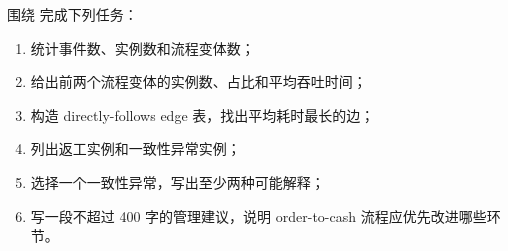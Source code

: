 \begin{exercise}
围绕  完成下列任务：
\begin{enumerate}[nosep]
  \item 统计事件数、实例数和流程变体数；
  \item 给出前两个流程变体的实例数、占比和平均吞吐时间；
  \item 构造 directly-follows edge 表，找出平均耗时最长的边；
  \item 列出返工实例和一致性异常实例；
  \item 选择一个一致性异常，写出至少两种可能解释；
  \item 写一段不超过 400 字的管理建议，说明 order-to-cash 流程应优先改进哪些环节。
\end{enumerate}
\end{exercise}
